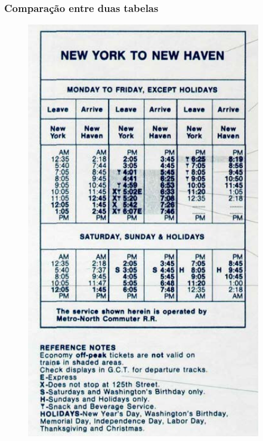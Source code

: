\begin{frame}
\frametitle{Comparação entre duas tabelas}
\begin{figure}[htbp]
\begin{minipage}[t]{0.47\textwidth}
\centering
\includegraphics[width=0.64\linewidth,height=0.7\textheight,keepaspectratio]{figures/timetable01.png}
\end{minipage}
\hfill
\begin{minipage}[t]{0.47\textwidth}
\centering

\end{minipage}
\end{figure}
\end{frame}
